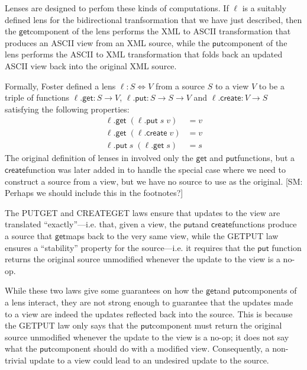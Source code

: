 \documentclass[acmsmall,review,anonymous]{acmart}\settopmatter{printfolios=true,printccs=false,printacmref=false}
\newcommand{\FINISH}[3]{\ifdraft\textcolor{#1}{[#2: #3]}\fi}
\newcommand{\sam}[1]{\FINISH{dkpurple}{SM}{#1}}
\newcommand{\kw}[1]{\ensuremath{\mathsf{#1}}}
\newcommand{\get}{\ensuremath{\kw{get}}}
\newcommand{\pput}{\ensuremath{\kw{put}}}
\newcommand{\create}{\ensuremath{\kw{create}}}
\begin{document}
Lenses are designed to perfom these kinds of computations. If $\ell$ is
a suitably defined lens for the bidirectional tranfsormation that we
have just described, then the \get component of the lens performs the
XML to ASCII transformation that produces an ASCII view from an XML source,
while the \pput component of the lens performs the ASCII to XML transformation
that folds back an updated ASCII view back into the original XML source.

Formally, Foster \cite{foster2007combinators,foster2009bidirectional} defined a lens $\ell :
S \Leftrightarrow V$ from a source $S$ to a view $V$ to be a triple of
functions $\ell.\get : S \longrightarrow V$, $\ell.\pput : S \longrightarrow S
\longrightarrow V$ and $\ell.\create : V \longrightarrow S$ satisfying the
following properties:
\begin{align*}
\ell.\get \; (\ell.\pput \; s \; v) &= v \tag{PUTGET}\\
\ell.\get \; (\ell.\create \; v) &= v \tag{CREATEGET}\\
\ell.\pput \; s \; (\ell.\get \; s) &= s \tag{GETPUT}
\end{align*}
The original definition of lenses in \cite{foster2007combinators} involved only the \get
and \pput functions, but a \create function was later added in
\cite{foster2009bidirectional} to handle the special case where we need to construct a
source from a view, but we have no source to use as the original. \sam{Perhaps
we should include this in the footnotes?}

The PUTGET and CREATEGET laws ensure that updates to the view are translated
``exactly''---i.e. that, given a view, the \pput and \create functions produce
a source that \get maps back to the very same view, while the GETPUT law ensures
a ``stability'' property for the source---i.e. it requires that the \pput
function returns the original source unmodified whenever the update to the view
is a no-op.

While these two laws give some guarantees on how the \get and \pput components
of a lens interact, they are not strong enough to guarantee that the
updates made to a view are indeed the updates reflected back into the source.
This is because the GETPUT law only says that the \pput component must return
the original source unmodified whenever the update to the view is a no-op; it
does not say what the \pput component should do with a modified view.
Consequently, a non-trivial update to a view could lead to an undesired update
to the source.
\end{document}
